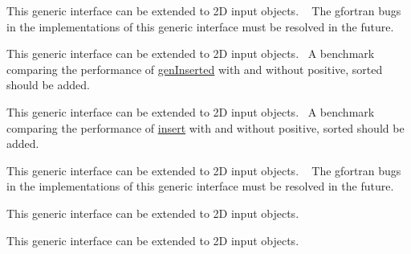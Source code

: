 
\begin{DoxyRefList}
\item[Type \mbox{\hyperlink{interfaceArrayComparison__mod_1_1iseqall}{Array\+Comparison\+\_\+mod\+::iseqall}} ]\label{todo__todo000001}%
%
 This generic interface can be extended to 2D input objects. ~\newline
 The gfortran bugs in the implementations of this generic interface must be resolved in the future. ~\newline
 
\item[Type \mbox{\hyperlink{interfaceArrayInsert__mod_1_1genInserted}{Array\+Insert\+\_\+mod\+::gen\+Inserted}} ]\label{todo__todo000002}%
%
 This generic interface can be extended to 2D input objects.~\newline
 A benchmark comparing the performance of \mbox{\hyperlink{interfaceArrayInsert__mod_1_1genInserted}{gen\+Inserted}} with and without {\ttfamily positive, sorted} should be added.~\newline
 
\item[Type \mbox{\hyperlink{interfaceArrayInsert__mod_1_1insert}{Array\+Insert\+\_\+mod\+::insert}} ]\label{todo__todo000003}%
%
 This generic interface can be extended to 2D input objects.~\newline
 A benchmark comparing the performance of \mbox{\hyperlink{interfaceArrayInsert__mod_1_1insert}{insert}} with and without {\ttfamily positive, sorted} should be added.~\newline
 
\item[Type \mbox{\hyperlink{interfaceArrayRemap__mod_1_1remap}{Array\+Remap\+\_\+mod\+::remap}} ]\label{todo__todo000004}%
%
 This generic interface can be extended to 2D input objects. ~\newline
 The gfortran bugs in the implementations of this generic interface must be resolved in the future. ~\newline
 
\item[Type \mbox{\hyperlink{interfaceArrayRemove__mod_1_1genRemoved}{Array\+Remove\+\_\+mod\+::gen\+Removed}} ]\label{todo__todo000005}%
%
 This generic interface can be extended to 2D input objects. ~\newline
 
\item[Type \mbox{\hyperlink{interfaceArrayRemove__mod_1_1remove}{Array\+Remove\+\_\+mod\+::remove}} ]\label{todo__todo000006}%
%
 This generic interface can be extended to 2D input objects. ~\newline
 

\end{DoxyRefList}
